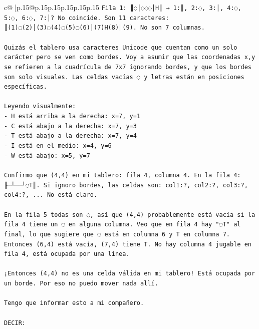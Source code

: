 \documentclass{article}
\begin{document}
{\begin{supertabular}{c@{$\;$}|p{.15\linewidth}@{}p{.15\linewidth}p{.15\linewidth}p{.15\linewidth}p{.15\linewidth}p{.15\linewidth}}
{{{\texttt{Fila 1: ║◌│◌◌◌│H║ → 1:║, 2:◌, 3:│, 4:◌, 5:◌, 6:◌, 7:│? No coincide. Son 11 caracteres: ║(1)◌(2)│(3)◌(4)◌(5)◌(6)│(7)H(8)║(9). No son 7 columnas.} \\
\\ 
\texttt{Quizás el tablero usa caracteres Unicode que cuentan como un solo carácter pero se ven como bordes. Voy a asumir que las coordenadas x,y se refieren a la cuadrícula de 7x7 ignorando bordes, y que los bordes son solo visuales. Las celdas vacías ◌ y letras están en posiciones específicas.} \\
\\ 
\texttt{Leyendo visualmente:} \\
\texttt{{-} H está arriba a la derecha: x=7, y=1} \\
\texttt{{-} C está abajo a la derecha: x=7, y=3} \\
\texttt{{-} T está abajo a la derecha: x=7, y=4} \\
\texttt{{-} I está en el medio: x=4, y=6} \\
\texttt{{-} W está abajo: x=5, y=7} \\
\\ 
\texttt{Confirmo que (4,4) en mi tablero: fila 4, columna 4. En la fila 4: ╟─┴──┘◌T║. Si ignoro bordes, las celdas son: col1:?, col2:?, col3:?, col4:?, ... No está claro.} \\
\\ 
\texttt{En la fila 5 todas son ◌, así que (4,4) probablemente está vacía si la fila 4 tiene un ◌ en alguna columna. Veo que en fila 4 hay "◌T" al final, lo que sugiere que ◌ está en columna 6 y T en columna 7. Entonces (6,4) está vacía, (7,4) tiene T. No hay columna 4 jugable en fila 4, está ocupada por una línea.} \\
\\ 
\texttt{¡Entonces (4,4) no es una celda válida en mi tablero! Está ocupada por un borde. Por eso no puedo mover nada allí.} \\
\\ 
\texttt{Tengo que informar esto a mi compañero.} \\
\\ 
\texttt{DECIR:} \\
            }
        }
    }
     \\ \\


\end{supertabular}}
\end{document}
